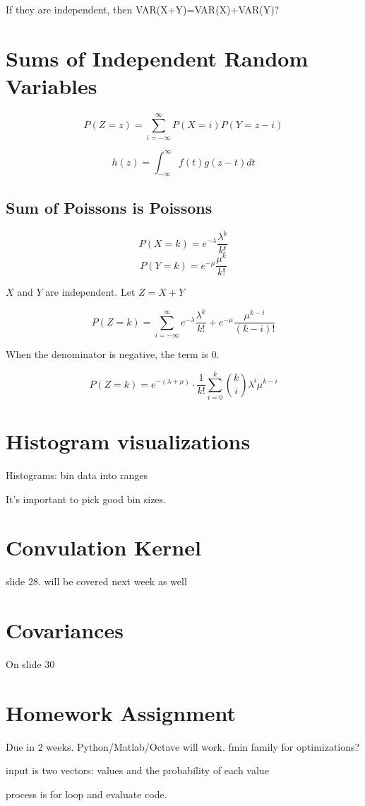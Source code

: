 \documentclass[a4paper]{article}
\begin{document}
If they are independent, then VAR(X+Y)=VAR(X)+VAR(Y)?

\section{Sums of Independent Random Variables}

\[P(Z=z)=\sum_{i=-\infty}^\infty P(X=i)P(Y=z-i)\]

\[h(z)=\int_{-\infty}^\infty f(t)g(z-t)dt\]

\subsection{Sum of Poissons is Poissons}

\[P(X=k)=e^{-\lambda}\frac{\lambda^k}{k!}\]
\[P(Y=k)=e^{-\mu}\frac{\mu^k}{k!}\]

$X$ and $Y$ are independent. Let $Z=X+Y$

\[P(Z=k)=\sum_{i=-\infty}^{\infty} e^{-\lambda}\frac{\lambda^k}{k!} + e^{-\mu}\frac{\mu^{k-i}}{(k-i)!}\]

When the denominator is negative, the term is 0. 

\[P(Z=k)=e^{-(\lambda+\mu)} \cdot \frac{1}{k!} \sum_{i=0}^{k} \binom{k}{i} \lambda^i\mu^{k-i}\]


\section{Histogram visualizations}

Histograms: bin data into ranges

It's important to pick good bin sizes.

\section{Convulation Kernel}

slide 28. will be covered next week as well

\section{Covariances}

On slide 30

\section{Homework Assignment}

Due in 2 weeks. Python/Matlab/Octave will work. fmin family for optimizations?

input is two vectors: values and the probability of each value

process is for loop and evaluate code.
\end{document}
